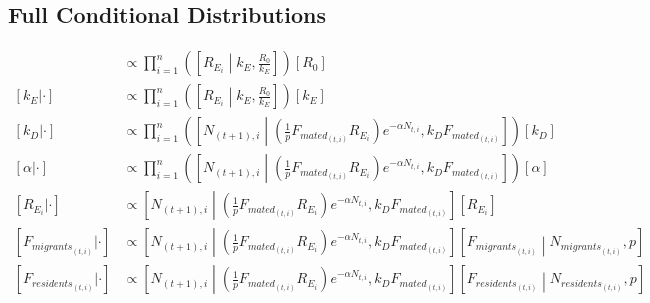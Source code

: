 \documentclass{article}[12pt]
\begin{document}
\subsection*{Full Conditional Distributions}
\begin{align*}
	[R_0 | \cdot] & \propto \prod_{i=1}^{n} \left( \left[ R_{E_i} \middle | k_{E}, \frac{R_{0}}{k_E} \right] \right)[R_0] \\
	[k_E | \cdot] & \propto \prod_{i=1}^{n}\left( \left[ R_{E_i} \middle | k_{E}, \frac{R_{0}}{k_E} \right] \right) \left[k_E \right] \\
	[k_D | \cdot] & \propto \prod_{i=1}^{n}\left( \left[N_{(t+1), i} \middle | \left(\frac{1}{p}F_{{mated}_{(t, i)}}R_{E_i} \right)e^{-\alpha N_{t, i}}, k_DF_{{mated}_{(t, i)}} \right] \right) \left[k_D \right] \\
	[\alpha | \cdot] & \propto \prod_{i=1}^{n}\left( \left[N_{(t+1), i} \middle | \left(\frac{1}{p}F_{{mated}_{(t, i)}}R_{E_i} \right)e^{-\alpha N_{t, i}}, k_DF_{{mated}_{(t, i)}} \right] \right) \left [\alpha \right] \\
	[R_{E_i} | \cdot] & \propto \left[ N_{(t+1), i} \middle | \left(\frac{1}{p}F_{{mated}_{(t, i)}}R_{E_i}\right)e^{-\alpha N_{t, i}}, k_DF_{{mated}_{(t, i)}}\right] \left[R_{E_i}\right] \\
	[F_{{migrants}_{(t, i)}} | \cdot] & \propto \left[N_{(t+1), i} \middle | \left(\frac{1}{p}F_{{mated}_{(t, i)}}R_{E_i} \right)e^{-\alpha N_{t, i}}, k_DF_{{mated}_{(t, i)}} \right] \left[F_{{migrants}_{(t, i)}}  \middle | N_{{migrants}_{(t, i)}},p \right] \\
	[F_{{residents}_{(t, i)}}  | \cdot] & \propto \left[N_{(t+1), i} \middle | \left(\frac{1}{p}F_{{mated}_{(t, i)}}R_{E_i} \right)e^{-\alpha N_{t, i}}, k_DF_{{mated}_{(t, i)}} \right] \left[F_{{residents}_{(t, i)}} \middle | N_{{residents}_{(t, i)}},p \right] 
\end{align*}


\end{document}
